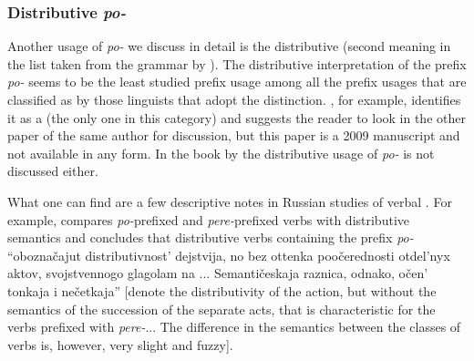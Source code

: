 
\subsubsection{Distributive \textit{po-}}

Another usage of \textit{po-} we discuss in detail is the distributive (second meaning in the list taken from the grammar by \citealt{Shvedova:82}). The distributive interpretation of the prefix \textit{po-} seems to be the least studied prefix usage among all the prefix usages that are classified as  by those linguists that adopt the distinction. \citet{Tatevosov:09}, for example, identifies it as a  (the only one in this category) and suggests the reader to look in the other paper of the same author for discussion, but this paper is a 2009 manuscript and not available in any form. In the book by \citet{Kagan:book} the distributive usage of \textit{po-} is not discussed either. 

What one can find are a few descriptive notes in Russian studies of verbal . For example, \citet[289--290]{Isachenko:60} compares \textit{po-}prefixed and \textit{pere-}prefixed verbs with distributive semantics and concludes that distributive verbs containing the prefix \textit{po-} ``obozna\v{c}ajut distributivnost' dejstvija, no bez ottenka poo\v{c}erednosti otdel'nyx aktov, svojstvennogo glagolam na ... Semanti\v{c}eskaja raznica, odnako, o\v{c}en' tonkaja i ne\v{c}etkaja'' [denote the distributivity of the action, but without the semantics of the succession of the separate acts, that is characteristic for the verbs prefixed with \textit{pere-}... The difference in the semantics between the classes of verbs is, however, very slight and fuzzy].


